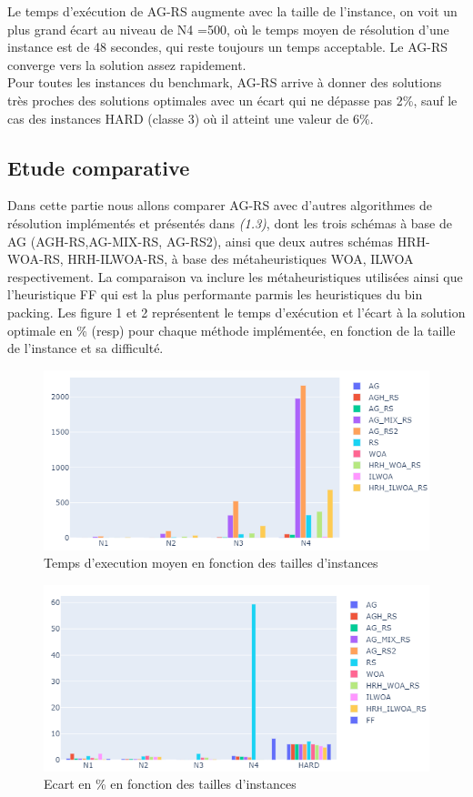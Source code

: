 \documentclass[preprint]{elsarticle}
\begin{document}
Le temps d'exécution de AG-RS augmente avec la taille de l’instance,  on  voit un plus grand écart au niveau de N4 =500, où le temps moyen de résolution d’une instance est de 48 secondes, qui reste toujours un temps acceptable. Le AG-RS converge vers la solution assez rapidement. \\
Pour toutes les instances du benchmark, AG-RS arrive à donner des solutions très proches des solutions optimales avec un écart qui ne dépasse pas 2\%, sauf le cas des instances  HARD (classe 3) où il atteint une valeur de 6\%.
\subsection{Etude comparative}
Dans cette partie nous allons comparer AG-RS avec d’autres algorithmes de résolution  implémentés et  présentés dans \emph{(1.3)}, dont les trois schémas à base de AG (AGH-RS,AG-MIX-RS, AG-RS2), ainsi que deux autres schémas HRH-WOA-RS, HRH-ILWOA-RS, à base des métaheuristiques WOA, ILWOA respectivement. La comparaison va inclure les métaheuristiques utilisées ainsi que l’heuristique FF qui est la plus performante parmis les heuristiques du bin packing. 
\newline Les figure 1 et 2 représentent le temps d'exécution et l’écart à la solution optimale en \% (resp) pour chaque méthode implémentée,  en fonction de la taille de l’instance et sa difficulté. 

\begin{figure}[H]
    \centering
    \includegraphics[scale=0.6]{./figures/texec (2).png}
    \caption{Temps d'execution moyen en fonction des tailles d'instances}
\end{figure}

\begin{figure}[H]
    \centering
    \includegraphics[scale=0.6]{./figures/ecart (2).png}
    \caption{Ecart en \% en fonction des tailles d'instances}
\end{figure}
\end{document}
